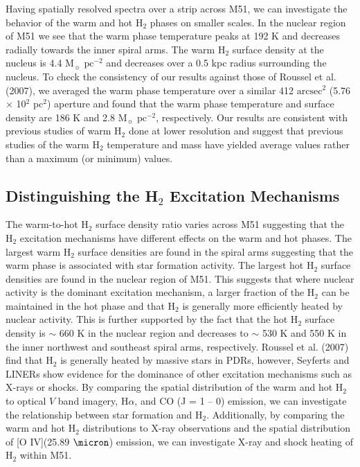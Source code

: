 \documentclass[12pt,preprint]{aastex}
\begin{document}
Having spatially resolved spectra over a strip across M51, we can 
investigate the behavior of the warm and hot H$_2$ phases 
on smaller scales.  In the nuclear region of M51 we see that the 
warm phase temperature peaks at 192 K and decreases 
radially towards the inner spiral arms.  The warm H$_2$ surface 
density at the nucleus is 4.4 $\mathrm{M_\sun}$ $\mathrm{pc^{-2}}$ 
and decreases over a 0.5 kpc radius surrounding the 
nucleus.  To check the consistency of 
our results against those of Roussel et al. (2007), we averaged the 
warm phase temperature over a similar 412 
$\mathrm{arcsec^2}$ (5.76 $\times$ 10$^2$ pc$^2$) aperture and
found that the warm phase temperature and surface density are
186 K and 2.8 $\mathrm{M_\sun}$ $\mathrm{pc^{-2}}$, 
respectively.  Our results are consistent with previous studies of 
warm H$_2$ done at lower resolution and suggest that 
previous studies of the warm H$_2$ temperature and 
mass have yielded average values rather than a maximum (or minimum) values.

\subsection{Distinguishing the H$_2$ Excitation Mechanisms}

The warm-to-hot H$_2$ surface density ratio varies across 
M51 suggesting that the H$_2$ excitation mechanisms 
have different effects on the warm and hot phases. 
The largest warm H$_2$ surface densities are found in 
the spiral arms suggesting that the warm phase is 
associated with star formation activity.  The largest 
hot H$_2$ surface densities are found in the nuclear 
region of M51.  This suggests that where nuclear 
activity is the dominant excitation mechanism, a 
larger fraction of the H$_2$ can be maintained in 
the hot phase and that H$_2$ is generally more 
efficiently heated by nuclear activity.  This is further supported 
by the fact that the hot H$_2$ surface density is $\sim$ 660 K 
in the nuclear region and decreases to $\sim$ 530 K and 
550 K in the inner northwest and southeast spiral 
arms, respectively.  Roussel et al. (2007) 
find that H$_2$ is generally heated by massive stars in 
PDRs, however, Seyferts and LINERs show evidence for 
the dominance of other excitation mechanisms such as 
X-rays or shocks.  By comparing the spatial distribution 
of the warm and hot H$_2$ to optical $V$ band imagery, H$\alpha$, and CO 
(J = 1 -- 0) emission, we can investigate the relationship 
between star formation and H$_2$.  Additionally, by 
comparing the warm and hot H$_2$ distributions to X-ray 
observations and the spatial distribution of [O IV](25.89 $\micron$) 
emission, we can investigate X-ray and shock heating 
of H$_2$ within M51.
\end{document}
